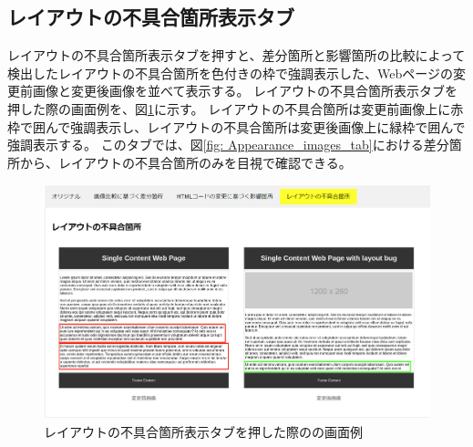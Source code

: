 \subsection{レイアウトの不具合箇所表示タブ}\label{subsec:subeffect_tab}
レイアウトの不具合箇所表示タブを押すと、差分箇所と影響箇所の比較によって検出したレイアウトの不具合箇所を色付きの枠で強調表示した、Webページの変更前画像と変更後画像を並べて表示する。
レイアウトの不具合箇所表示タブを押した際の画面例を、図\ref{fig: Appearance_subEffect_tab}に示す。
レイアウトの不具合箇所は変更前画像上に赤枠で囲んで強調表示し、レイアウトの不具合箇所は変更後画像上に緑枠で囲んで強調表示する。
このタブでは、図\ref{fig: Appearance_images_tab}における差分箇所から、レイアウトの不具合箇所のみを目視で確認できる。
\begin{figure}[tp]
    \begin{center}
        \includegraphics[width=1.0\columnwidth]{image/3_subEffect_tab2.png}
        \caption{レイアウトの不具合箇所表示タブを押した際の\toolName の画面例}
        \label{fig: Appearance_subEffect_tab}
    \end{center}
\end{figure}
